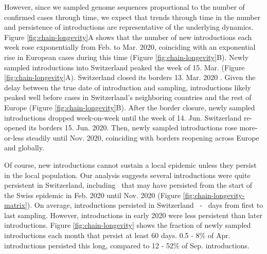 \documentclass[11pt,twoside,lineno]{pnas-new} %
\begin{document}
However, since we sampled genome sequences proportional to the number of confirmed cases through time, we expect that trends through time in the number and persistence of introductions are representative of the underlying dynamics. Figure \ref{fig:chain-longevity}A shows that the number of new introductions each week rose exponentially from Feb. to Mar. 2020, coinciding with an exponential rise in European cases during this time (Figure \ref{fig:chain-longevity}B). Newly sampled introductions into Switzerland peaked the week of 15. Mar. (Figure \ref{fig:chain-longevity}A). Switzerland closed its borders 13. Mar. 2020 \cite{SWI-border-closure}. Given the delay between the true date of introduction and sampling, introductions likely peaked well before cases in Switzerland's neighboring countries and the rest of Europe (Figure \ref{fig:chain-longevity}B). After the border closure, newly sampled introductions dropped week-on-week until the week of 14. Jun. Switzerland re-opened its borders 15. Jun. 2020. Then, newly sampled introductions rose more-or-less steadily until Nov. 2020, coinciding with borders reopening across Europe and globally. 

Of course, new introductions cannot sustain a local epidemic unless they persist in the local population. Our analysis suggests several introductions were quite persistent in Switzerland, including \nspanningchainsfebnovmin\ that may have persisted from the start of the Swiss epidemic in Feb. 2020 until Nov. 2020 (Figure \ref{fig:chain-longevity-matrix}). On average, introductions persisted in Switzerland \meantimetolastsamplemax\ - \meantimetolastsamplemin\ days from first to last sampling. However, introductions in early 2020 were less persistent than later introductions. Figure \ref{fig:chain-longevity} shows the fraction of newly sampled introductions each month that persist at least 60 days. 0.5 - 8\% of Apr. introductions persisted this long, compared to 12 - 52\% of Sep. introductions. 
\end{document}
